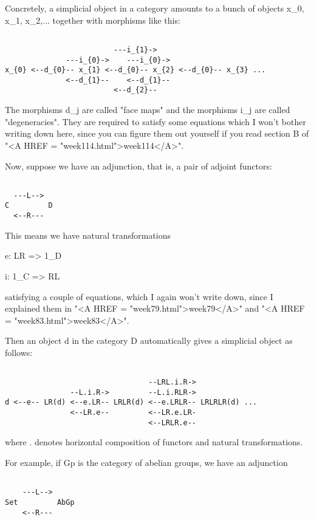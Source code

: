 Concretely, a simplicial object in a category amounts to a bunch of
objects x_{0}, x_{1}, x_{2},... together with morphisms like this:


\begin{verbatim}

                         ---i_{1}->
              ---i_{0}->    ---i_{0}->
x_{0} <--d_{0}-- x_{1} <--d_{0}-- x_{2} <--d_{0}-- x_{3} ...
              <--d_{1}--    <--d_{1}--
                         <--d_{2}--
\end{verbatim}
    
The morphisms d_{j} are called "face maps" and the morphisms i_{j} are
called "degeneracies".  They are required to satisfy some equations
which I won't bother writing down here, since you can figure them out
yourself if you read section B of "<A HREF = "week114.html">week114</A>".  

Now, suppose we have an adjunction, that is, a pair of adjoint functors:


\begin{verbatim}

  ---L-->
C         D
  <--R---
\end{verbatim}
    
This means we have natural transformations

e: LR => 1_{D}

i: 1_{C} => RL

satisfying a couple of equations, which I again won't write down, since
I explained them in "<A HREF = "week79.html">week79</A>" and "<A HREF = "week83.html">week83</A>".  

Then an object d in the category D automatically gives a simplicial
object as follows:


\begin{verbatim}

                                 --LRL.i.R->
               --L.i.R->         --L.i.RLR->
d <--e-- LR(d) <--e.LR-- LRLR(d) <--e.LRLR-- LRLRLR(d) ...
               <--LR.e--         <--LR.e.LR-
                                 <--LRLR.e--
\end{verbatim}
    
where . denotes horizontal composition of functors and natural
transformations.

For example, if Gp is the category of abelian groups, we have an
adjunction

\begin{verbatim}

    ---L-->
Set         AbGp
    <--R---
\end{verbatim}
    
